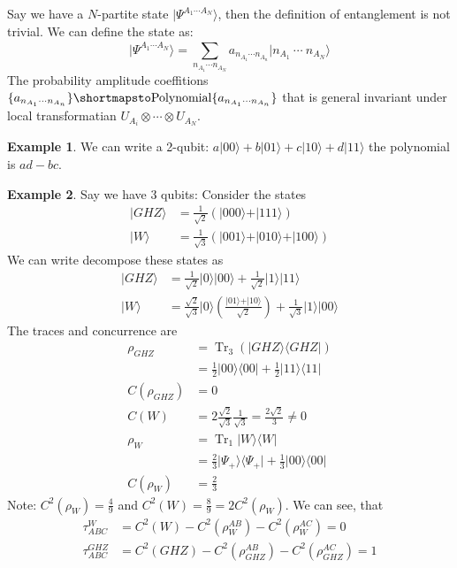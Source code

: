 \documentclass[12pt]{book}
\theoremstyle{definition}
\newtheorem*{example}{\bfseries Example}
\let\oldsum\sum
\renewcommand{\sum}[2]{\oldsum\limits_{#1}^{#2}}
\let\mapsto\shortmapsto
\newcommand{\mapsto}{\longmapsto}
\newcommand{\para}[1]{\left( {#1} \right)}
\newcommand{\bra}[1]{\langle {#1} \vert}
\newcommand{\ket}[1]{\vert {#1} \rangle}
\DeclareMathOperator{\tr}{Tr}
\begin{document}
Say we have a $N$-partite state $\ket{\Psi^{A_1\cdots A_N}}$, then the definition of entanglement is not trivial. We can define the state as:
\begin{equation}
  \ket{\Psi^{A_1\cdots A_N}} = \sum{n_{A_1}\cdots n_{A_N}}{}
  a_{n_{A_1} \cdots n_{A_n}} \ket{n_{A_1}\:\cdots\: n_{A_N}}
\end{equation}
The probability amplitude coeffitions $\{a_{n_{A_1}\cdots n_{A_n}}\} \mapsto \textrm{Polynomial}\{a_{n_{A_1}\cdots n_{A_n}}\}$ that is general invariant under local transformatian $U_{A_i} \otimes \cdots \otimes U_{A_N}$.
\begin{example}
  We can write a 2-qubit: $a \ket{00} + b \ket{01} + c \ket{10} + d \ket{11}$ the polynomial is $ad - bc$.
\end{example}
\begin{example}
  Say we have 3 qubits: Consider the states
  \begin{align*}
    \ket{GHZ} & = \frac{1}{\sqrt{2}} \para{\ket{000} + \ket{111}} \\
    \ket{W} & = \frac{1}{\sqrt{3}} \para{\ket{001} + \ket{010} + \ket{100}}
  \end{align*}
  We can write decompose these states as
  \begin{align*}
    \ket{GHZ} & = \frac{1}{\sqrt{2}} \ket{0} \ket{00} + \frac{1}{\sqrt{2}} \ket{1} \ket{11} \\
    \ket{W} & = \frac{\sqrt{2}}{\sqrt{3}} \ket{0} \para{\frac{\ket{01} + \ket{10}}{\sqrt{2}}} + \frac{1}{\sqrt{3}} \ket{1} \ket{00}
  \end{align*}
  The traces and concurrence are
  \begin{align*}
    \rho_{GHZ} & = \tr_3(\ket{GHZ}\bra{GHZ}) \\
    & = \frac{1}{2} \ket{00}\bra{00} + \frac{1}{2}\ket{11}\bra{11} \\
    C(\rho_{GHZ}) & = 0 \\
    C(W) & = 2 \frac{\sqrt{2}}{\sqrt{3}} \frac{1}{\sqrt{3}} = \frac{2\sqrt{2}}{3} \neq 0 \\
    \rho_W & = \tr_1 \ket{W} \bra{W} \\
    & = \frac{2}{3} \ket{\Psi_+} \bra{\Psi_+} + \frac{1}{3} \ket{00}\bra{00} \\
    C(\rho_W) & = \frac{2}{3}
  \end{align*}
  Note: $C^2(\rho_W) = \frac{4}{9}$ and $C^2(W) = \frac{8}{9} = 2 C^2(\rho_W)$. We can see, that
  \begin{align*}
    \tau_{ABC}^W & = C^2(W) - C^2(\rho_W^{AB}) - C^2(\rho_W^{AC}) = 0 \\
    \tau_{ABC}^{GHZ} & = C^2(GHZ) - C^2(\rho_{GHZ}^{AB}) - C^2(\rho_{GHZ}^{AC}) = 1
  \end{align*}
\end{example}
\end{document}
